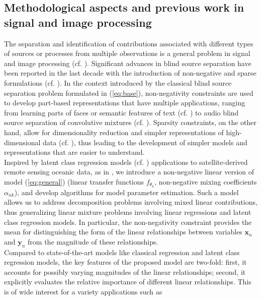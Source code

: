 \documentclass[10pt]{extarticle}
\begin{document}
\subsection*{Methodological aspects and previous work in signal and image processing}
The separation and identification of contributions associated with different types of sources or processes from multiple observations is a general problem in signal and image processing (cf. \cite{BSS}). %
Significant advances in blind source separation have been reported in the last decade with the introduction of non-negative and sparse formulations (cf. \cite{parts, fevotte, ozerov, sparse}). In the context introduced by the classical blind source separation problem formulated in (\ref{eq:base}), non-negativity constraints are used to develop part-based representations that have multiple applications, ranging from learning parts of faces or semantic features of text (cf. \cite{parts}) to audio blind source separation of convolutive mixtures (cf. \cite{fevotte}). Sparsity constraints, on the other hand, allow for dimensionality reduction and simpler representations of high-dimensional data (cf. \cite{lasso}), thus leading to the development of simpler models and representations that are easier to understand.\\
Inspired by latent class regression models (cf. \cite{latent}) applications to satellite-derived remote sensing oceanic data, as in \cite{tandeo}, we introduce a non-negative linear version of model (\ref{eq:general}) (linear transfer functions $f_{\theta_k}$, non-negative mixing coefficients $\alpha_{nk}$), and develop algorithms for model parameter estimation. Such a model allows us to address decomposition problems involving mixed linear contributions, thus generalizing linear mixture problems involving linear regressions and latent class regression models. In particular, the non-negativity constraint provides the mean for distinguishing the form of the linear relationships between variables $\mathbf{x}_n$ and $\mathbf{y}_n$ from the magnitude of these relationships.\\
Compared to state-of-the-art models like classical regression and latent class regression models, the key features of the proposed model are two-fold: first, it accounts for possibly varying magnitudes of the linear relationships; second, it explicitly evaluates the relative importance of different linear relationships. This is of wide interest for a variety applications such as %
\end{document}
